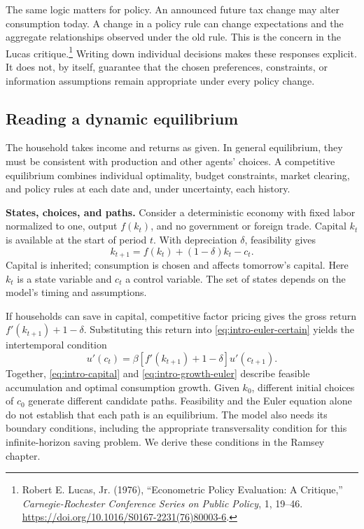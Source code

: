 The same logic matters for policy. An announced future tax change may alter
consumption today. A change in a policy rule can change expectations and the
aggregate relationships observed under the old rule. This is the concern in
the Lucas critique.\footnote{Robert E. Lucas, Jr. (1976), ``Econometric Policy
Evaluation: A Critique,'' \textit{Carnegie-Rochester Conference Series on Public
Policy}, 1, 19--46. \url{https://doi.org/10.1016/S0167-2231(76)80003-6}.}
Writing down individual decisions makes these responses explicit. It does not,
by itself, guarantee that the chosen preferences, constraints, or information
assumptions remain appropriate under every policy change.

\subsection{Reading a dynamic equilibrium}\label{sec:intro-equilibrium}

The household takes income and returns as given. In general equilibrium, they
must be consistent with production and other agents' choices. A competitive
equilibrium combines individual optimality, budget constraints, market clearing,
and policy rules at each date and, under uncertainty, each history.

\textbf{States, choices, and paths.}
Consider a deterministic economy with fixed labor normalized to one, output
$f(k_t)$, and no government or foreign trade. Capital $k_t$ is available at the
start of period $t$. With depreciation $\delta$, feasibility gives
\begin{equation}\label{eq:intro-capital}
k_{t+1}=f(k_t)+(1-\delta)k_t-c_t.
\end{equation}
Capital is inherited; consumption is chosen and affects tomorrow's capital.
Here $k_t$ is a state variable and $c_t$ a control variable. The set of states
depends on the model's timing and assumptions.

If households can save in capital, competitive factor pricing gives the gross
return $f'(k_{t+1})+1-\delta$. Substituting this return into
\eqref{eq:intro-euler-certain} yields the intertemporal condition
\begin{equation}\label{eq:intro-growth-euler}
u'(c_t)=\beta\left[f'(k_{t+1})+1-\delta\right]u'(c_{t+1}).
\end{equation}
Together, \eqref{eq:intro-capital} and \eqref{eq:intro-growth-euler} describe
feasible accumulation and optimal consumption growth. Given $k_0$, different
initial choices of $c_0$ generate different candidate paths. Feasibility and
the Euler equation alone do not establish that each path is an equilibrium.
The model also needs its boundary conditions, including the appropriate
transversality condition for this infinite-horizon saving problem. We derive
these conditions in the Ramsey chapter.

